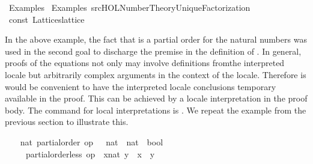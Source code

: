 %
\begin{isabellebody}%
\def\isabellecontext{Examples{\isadigit{3}}}%
%
\isadelimtheory
%
\endisadelimtheory
%
\isatagtheory
{}\isamarkupfalse%
\ Examples{}\isanewline
{}\ Examples\ {\isachardoublequoteopen}{\isachartilde}{\isachartilde}{\isacharslash}src{\isacharslash}HOL{\isacharslash}Number{\isacharunderscore}Theory{\isacharslash}UniqueFactorization{\isachardoublequoteclose}\isanewline
{}%
\endisatagtheory
{\isafoldtheory}%
%
\isadelimtheory
\isanewline
%
\endisadelimtheory
%
\isadeliminvisible
%
\endisadeliminvisible
%
\isataginvisible
{}\isamarkupfalse%
\ const\ Lattices{\isachardot}lattice%
\endisataginvisible
{\isafoldinvisible}%
%
\isadeliminvisible
%
\endisadeliminvisible
%
\begin{isamarkuptext}%
\vspace{-5ex}%
\end{isamarkuptext}%
\isamarkuptrue%
%
\isamarkuptrue%
%
\begin{isamarkuptext}%
In the above example, the fact that  is a partial
  order for the natural numbers was used in the second goal to
  discharge the premise in the definition of .  In
  general, proofs of the equations not only may involve definitions
  fromthe interpreted locale but arbitrarily complex arguments in the
  context of the locale.  Therefore is would be convenient to have the
  interpreted locale conclusions temporary available in the proof.
  This can be achieved by a locale interpretation in the proof body.
  The command for local interpretations is .  We
  repeat the example from the previous section to illustrate this.%
\end{isamarkuptext}%
\isamarkuptrue%
%
\isadelimvisible
\ \ %
\endisadelimvisible
%
\isatagvisible
{}\isamarkupfalse%
\ nat{\isacharcolon}\ partial{\isacharunderscore}order\ {\isachardoublequoteopen}op\ {\isasymle}\ {\isacharcolon}{\isacharcolon}\ nat\ {\isasymRightarrow}\ nat\ {\isasymRightarrow}\ bool{\isachardoublequoteclose}\isanewline
\ \ \ \ \ {\isachardoublequoteopen}partial{\isacharunderscore}order{\isachardot}less\ op\ {\isasymle}\ {\isacharparenleft}x{\isacharcolon}{\isacharcolon}nat{\isacharparenright}\ y\ {\isacharequal}\ {\isacharparenleft}x\ {\isacharless}\ y{\isacharparenright}{\isachardoublequoteclose}\isanewline
\ \ \isamarkupfalse%

\end{isabellebody}
